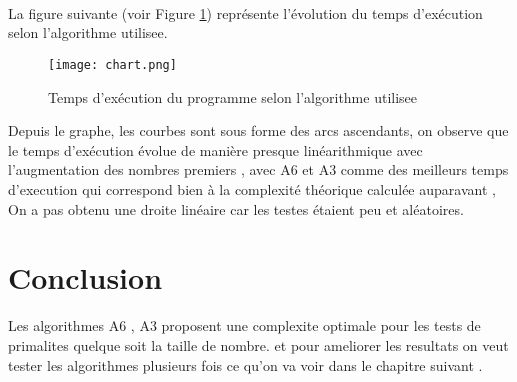 \\ \\
\par
\small
{}
\\

\normalsize
\par
La figure suivante (voir Figure \ref{fig:chart}) représente l'évolution du temps d'exécution selon l'algorithme utilisee.

\begin{figure}[H]
    \centering
        \texttt{[image: chart.png]}
        \caption{Temps d'exécution du programme selon l'algorithme utilisee}
    \label{fig:chart}
\end{figure}
\par
Depuis le graphe, les courbes  sont sous forme des arcs ascendants, on observe que le temps d’exécution évolue de manière presque linéarithmique avec l’augmentation des nombres premiers , avec A6 et A3 comme des meilleurs temps d'execution qui correspond bien à la complexité théorique calculée auparavant , On a pas obtenu une droite linéaire
car les testes étaient peu et aléatoires.

\section{Conclusion}
Les algorithmes A6 , A3 proposent une complexite optimale pour les tests de primalites quelque soit la taille de nombre. et pour ameliorer les resultats on veut tester les algorithmes plusieurs fois ce qu'on va voir dans le chapitre suivant .